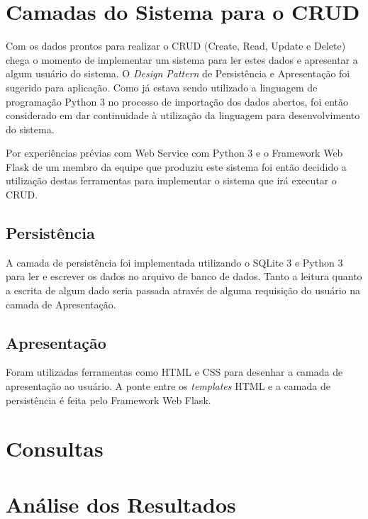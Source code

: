 \documentclass[12pt]{article}
\begin{document}
	\section{Camadas do Sistema para o CRUD}
	\label{sec:camadas}
	
	Com os dados prontos para realizar o CRUD (Create, Read, Update e Delete) chega o momento de implementar um sistema para ler estes dados e apresentar a algum usuário do sistema. O \textit{Design Pattern} de Persistência e Apresentação foi sugerido para aplicação. Como já estava sendo utilizado a linguagem de programação Python 3 no processo de importação dos dados abertos, foi então considerado em dar continuidade à utilização da linguagem para desenvolvimento do sistema.
	
	Por experiências prévias com Web Service com Python 3 e o Framework Web Flask de um membro da equipe que produziu este sistema foi então decidido a utilização destas ferramentas para implementar o sistema que irá executar o CRUD.
	
	\subsection{Persistência}
	\label{sec:pers}
	
	A camada de persistência foi implementada utilizando o SQLite 3 e Python 3 para ler e escrever os dados no arquivo de banco de dados. Tanto a leitura quanto a escrita de algum dado seria passada através de alguma requisição do usuário na camada de Apresentação.
	
	\subsection{Apresentação}
	\label{sec:apt}
	
	Foram utilizadas ferramentas como HTML e CSS para desenhar a camada de apresentação ao usuário. A ponte entre os \textit{templates} HTML e a camada de persistência é feita pelo Framework Web Flask.
	
	\section{Consultas} 
	\label{sec:consultas}
	
	\section{Análise dos Resultados}
	\label{sec:resultados}
	

 

	
\end{document}
